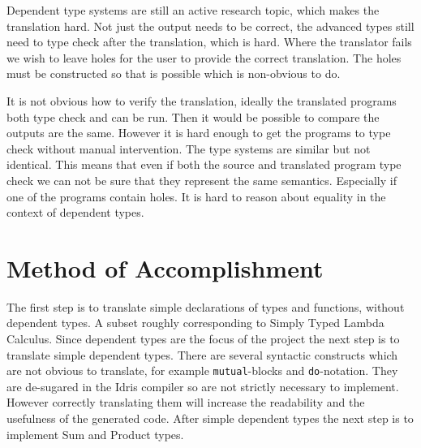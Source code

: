 \documentclass[parskip=half]{scrartcl}
\begin{document}

Dependent type systems are still an active research topic, which makes the
translation hard. 
Not just the output needs to be correct, the advanced types
still need to type check after the translation, which is hard.
Where the translator fails we wish to leave holes for the user to provide the
correct translation. The holes must be constructed so that is possible which is
non-obvious to do.

It is not obvious how to verify the translation, ideally the translated
programs both type check and can be run. Then it would be possible to compare
the outputs are the same. However it is hard enough to get the programs to type
check without manual intervention. The type systems are similar but not
identical. This means that even if both the source and translated program
type check we can not be sure that they represent the same semantics.
Especially if one of the programs contain holes. It is hard to reason about
equality in the context of dependent types.


\section{Method of Accomplishment}
The first step is to translate simple declarations of types and functions,
without dependent types. A subset roughly corresponding to Simply Typed Lambda
Calculus. Since dependent types are the focus of the project the next step is
to translate simple dependent types. There are several syntactic constructs
which are not obvious to translate, for example \texttt{mutual}-blocks and
\texttt{do}-notation. They are de-sugared in the Idris compiler so are not strictly
necessary to implement. However correctly translating them will increase the
readability and the usefulness of the generated code.
After simple dependent
types the next step is to implement Sum and Product types.
\end{document}
